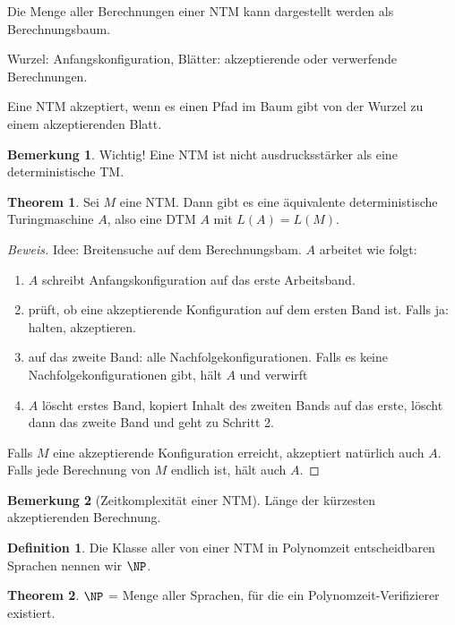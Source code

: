 \documentclass[11pt]{article} %
\theoremstyle{definition}
\newtheorem{definition}{Definition}
\newtheorem*{bemerkung}{Bemerkung}
\newtheorem{theorem}{Theorem}
\begin{document}
Die Menge aller Berechnungen einer NTM kann dargestellt werden als Berechnungsbaum.

Wurzel: Anfangskonfiguration, Blätter: akzeptierende oder verwerfende Berechnungen.

Eine NTM akzeptiert, wenn es einen Pfad im Baum gibt von der Wurzel zu einem akzeptierenden Blatt.

\begin{bemerkung}
Wichtig! Eine NTM ist nicht ausdrucksstärker als eine deterministische TM.
\end{bemerkung}

\begin{theorem}
Sei $M$ eine NTM. Dann gibt es eine äquivalente deterministische Turingmaschine $A$, also eine DTM $A$ mit $L(A) = L(M)$.
\end{theorem}

\begin{proof}[Beweis]
Idee: Breitensuche auf dem Berechnungsbam. $A$ arbeitet wie folgt:

\begin{enumerate}
\item $A$ schreibt Anfangskonfiguration auf das erste Arbeitsband.
\item prüft, ob eine akzeptierende Konfiguration auf dem ersten Band ist. Falls ja: halten, akzeptieren.
\item auf das zweite Band: alle Nachfolgekonfigurationen. Falls es keine Nachfolgekonfigurationen gibt, hält $A$ und verwirft
\item $A$ löscht erstes Band, kopiert Inhalt des zweiten Bands auf das erste, löscht dann das zweite Band und geht zu Schritt 2.
\end{enumerate}

Falls $M$ eine akzeptierende Konfiguration erreicht, akzeptiert natürlich auch $A$. Falls jede Berechnung von $M$ endlich ist, hält auch $A$.
\end{proof}

\begin{bemerkung}[Zeitkomplexität einer NTM] Länge der kürzesten akzeptierenden Berechnung.

\end{bemerkung}

\begin{definition}
Die Klasse aller von einer NTM in Polynomzeit entscheidbaren Sprachen nennen wir $\NP$.
\end{definition}

\begin{theorem}
$\NP$ = Menge aller Sprachen, für die ein Polynomzeit-Verifizierer existiert.
\end{theorem}
\end{document}
